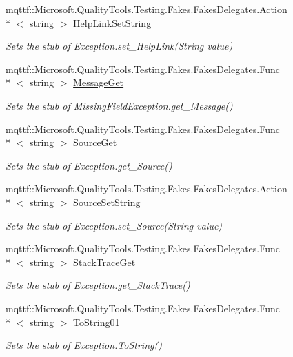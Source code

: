 \begin{DoxyCompactItemize}
mqttf\-::\-Microsoft.\-Quality\-Tools.\-Testing.\-Fakes.\-Fakes\-Delegates.\-Action\\*
$<$ string $>$ \hyperlink{class_system_1_1_fakes_1_1_stub_missing_field_exception_afae60415c03d6cf8f49eecf19ad7dfa4}{Help\-Link\-Set\-String}
\begin{DoxyCompactList}\small\item\em Sets the stub of Exception.\-set\-\_\-\-Help\-Link(\-String value)\end{DoxyCompactList}\item 
mqttf\-::\-Microsoft.\-Quality\-Tools.\-Testing.\-Fakes.\-Fakes\-Delegates.\-Func\\*
$<$ string $>$ \hyperlink{class_system_1_1_fakes_1_1_stub_missing_field_exception_ac5da13354c2f52311120a1d8d7478d42}{Message\-Get}
\begin{DoxyCompactList}\small\item\em Sets the stub of Missing\-Field\-Exception.\-get\-\_\-\-Message()\end{DoxyCompactList}\item 
mqttf\-::\-Microsoft.\-Quality\-Tools.\-Testing.\-Fakes.\-Fakes\-Delegates.\-Func\\*
$<$ string $>$ \hyperlink{class_system_1_1_fakes_1_1_stub_missing_field_exception_a08ec787aeca9e8c300e59db4c8958b0a}{Source\-Get}
\begin{DoxyCompactList}\small\item\em Sets the stub of Exception.\-get\-\_\-\-Source()\end{DoxyCompactList}\item 
mqttf\-::\-Microsoft.\-Quality\-Tools.\-Testing.\-Fakes.\-Fakes\-Delegates.\-Action\\*
$<$ string $>$ \hyperlink{class_system_1_1_fakes_1_1_stub_missing_field_exception_ababec29f2cdcd2b476f10690f5dd0579}{Source\-Set\-String}
\begin{DoxyCompactList}\small\item\em Sets the stub of Exception.\-set\-\_\-\-Source(\-String value)\end{DoxyCompactList}\item 
mqttf\-::\-Microsoft.\-Quality\-Tools.\-Testing.\-Fakes.\-Fakes\-Delegates.\-Func\\*
$<$ string $>$ \hyperlink{class_system_1_1_fakes_1_1_stub_missing_field_exception_a5f655344584f68d70d922eb7ae5fd46d}{Stack\-Trace\-Get}
\begin{DoxyCompactList}\small\item\em Sets the stub of Exception.\-get\-\_\-\-Stack\-Trace()\end{DoxyCompactList}\item 
mqttf\-::\-Microsoft.\-Quality\-Tools.\-Testing.\-Fakes.\-Fakes\-Delegates.\-Func\\*
$<$ string $>$ \hyperlink{class_system_1_1_fakes_1_1_stub_missing_field_exception_adec10e9d5b9cd5fc534bc11045cec13b}{To\-String01}
\begin{DoxyCompactList}\small\item\em Sets the stub of Exception.\-To\-String()\end{DoxyCompactList}\end{DoxyCompactItemize}
